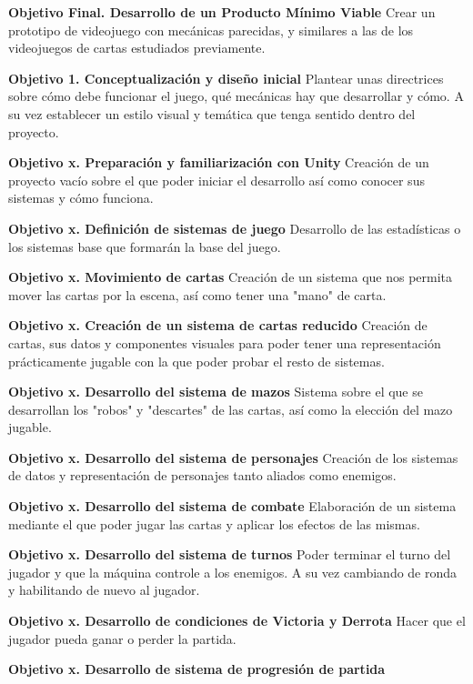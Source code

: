 \begin{description}
\item \textbf{Objetivo Final. Desarrollo de un Producto Mínimo Viable}
Crear un prototipo de videojuego con mecánicas parecidas, y similares a las de los videojuegos de cartas estudiados previamente. 
\item \textbf{Objetivo 1. Conceptualización y diseño inicial}
Plantear unas directrices sobre cómo debe funcionar el juego, qué mecánicas hay que desarrollar y cómo. A su vez establecer un estilo visual y temática que tenga sentido dentro del proyecto.
\item \textbf{Objetivo x. Preparación y familiarización con Unity}
Creación de un proyecto vacío sobre el que poder iniciar el desarrollo así como conocer sus sistemas y cómo funciona.
\item \textbf{Objetivo x. Definición de sistemas de juego}
Desarrollo de las estadísticas o los sistemas base que formarán la base del juego.
\item \textbf{Objetivo x. Movimiento de cartas}
Creación de un sistema que nos permita mover las cartas por la escena, así como tener una "mano" de carta.
\item \textbf{Objetivo x. Creación de un sistema de cartas reducido}
Creación de cartas, sus datos y componentes visuales para poder tener una representación prácticamente jugable con la que poder probar el resto de sistemas.
\item \textbf{Objetivo x. Desarrollo del sistema de mazos}
Sistema sobre el que se desarrollan los "robos" y "descartes" de las cartas, así como la elección del mazo jugable.
\item \textbf{Objetivo x. Desarrollo del sistema de personajes}
Creación de los sistemas de datos y representación de personajes tanto aliados como enemigos.
\item \textbf{Objetivo x. Desarrollo del sistema de combate}
Elaboración de un sistema mediante el que poder jugar las cartas y aplicar los efectos de las mismas.
\item \textbf{Objetivo x. Desarrollo del sistema de turnos}
Poder terminar el turno del jugador y que la máquina controle a los enemigos. A su vez cambiando de ronda y habilitando de nuevo al jugador.
\item \textbf{Objetivo x. Desarrollo de condiciones de Victoria y Derrota}
Hacer que el jugador pueda ganar o perder la partida.
\item \textbf{Objetivo x. Desarrollo de sistema de progresión de partida}

\end{description}
